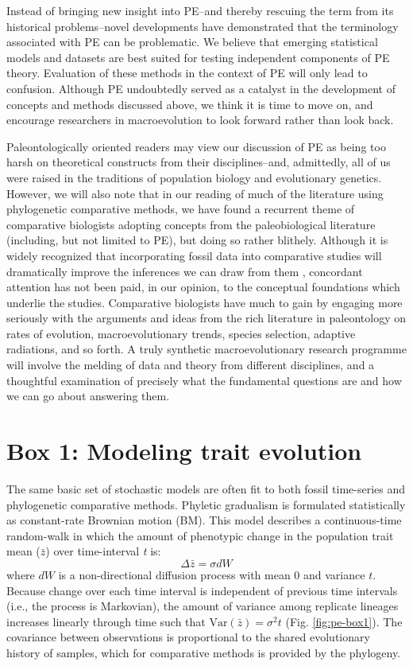 Instead of bringing new insight into PE--and thereby rescuing the term from its historical problems--novel developments have demonstrated that the terminology associated with PE can be problematic. We believe that emerging statistical models and datasets are best suited for testing independent components of PE theory. Evaluation of these methods in the context of PE will only lead to confusion. Although PE undoubtedly served as a catalyst in the development of concepts and methods discussed above, we think it is time to move on, and encourage researchers in macroevolution to look forward rather than look back. 

Paleontologically oriented readers may view our discussion of PE as being too harsh on theoretical constructs from their disciplines--and, admittedly, all of us were raised in the traditions of population biology and evolutionary genetics. However, we will also note that in our reading of much of the literature using phylogenetic comparative methods, we have found a recurrent theme of comparative biologists adopting concepts from the paleobiological literature (including, but not limited to PE), but doing so rather blithely. Although it is widely recognized that incorporating fossil data into comparative studies will dramatically improve the inferences we can draw from them \citep{QuentalMarshall2010, Slater2012Fossil, PennellHarmon, Fritz2013}, concordant attention has not been paid, in our opinion, to the conceptual foundations which underlie the studies. Comparative biologists have much to gain by engaging more seriously with the arguments and ideas from the rich literature in paleontology on rates of evolution, macroevolutionary trends, species selection, adaptive radiations, and so forth. A truly synthetic macroevolutionary research programme will involve the melding of data and theory from different disciplines, and a thoughtful examination of precisely what the fundamental questions are and how we can go about answering them.

\section{Box 1: Modeling trait evolution}
The same basic set of stochastic models are often fit to both fossil time-series and phylogenetic comparative methods. Phyletic gradualism is formulated statistically as constant-rate Brownian motion (BM). This model describes a continuous-time random-walk in which the amount of phenotypic change in the population trait mean ($\bar{z}$) over time-interval \textit{t} is:
\begin{equation}
\Delta \bar{z} = \sigma dW
\end{equation}
where $dW$ is a non-directional diffusion process with mean 0 and variance $t$. Because change over each time interval is independent of previous time intervals (i.e., the process is Markovian), the amount of variance among replicate lineages increases linearly through time such that  $\text{Var}(\bar{z}) = \sigma^2 t$ (Fig. \ref{fig:pe-box1}). The covariance between observations is proportional to the shared evolutionary history of samples, which for comparative methods is provided by the phylogeny. 

